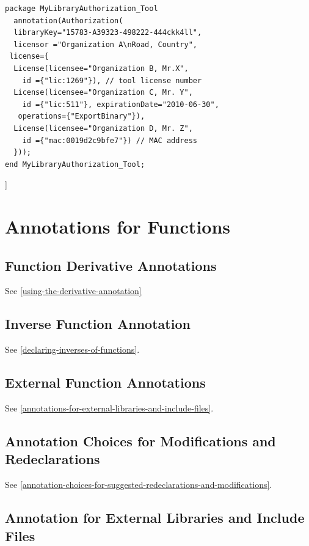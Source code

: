 \documentclass[10pt,a4paper]{report}
\def\doublelabel#1{\label{#1}\hypertarget{#1}{}}
\begin{document}
\begin{lstlisting}[language=modelica]
package MyLibraryAuthorization_Tool
  annotation(Authorization(
  libraryKey="15783-A39323-498222-444ckk4ll",
  licensor ="Organization A\nRoad, Country",
 license={
  License(licensee="Organization B, Mr.X",
    id ={"lic:1269"}), // tool license number
  License(licensee="Organization C, Mr. Y",
    id ={"lic:511"}, expirationDate="2010-06-30",
   operations={"ExportBinary"}),
  License(licensee="Organization D, Mr. Z",
    id ={"mac:0019d2c9bfe7"}) // MAC address
  }));
end MyLibraryAuthorization_Tool;
\end{lstlisting}
{]}

\section{Annotations for Functions}\doublelabel{annotations-for-functions}

\subsection{Function Derivative Annotations}\doublelabel{function-derivative-annotations}

See \ref{using-the-derivative-annotation}

\subsection{Inverse Function Annotation}\doublelabel{inverse-function-annotation}

See \ref{declaring-inverses-of-functions}.

\subsection{External Function Annotations}\doublelabel{external-function-annotations}

See \ref{annotations-for-external-libraries-and-include-files}.

\subsection{Annotation Choices for Modifications and Redeclarations}\doublelabel{annotation-choices-for-modifications-and-redeclarations}

See \ref{annotation-choices-for-suggested-redeclarations-and-modifications}.

\subsection{Annotation for External Libraries and Include Files}\doublelabel{annotation-for-external-libraries-and-include-files}
\end{document}
